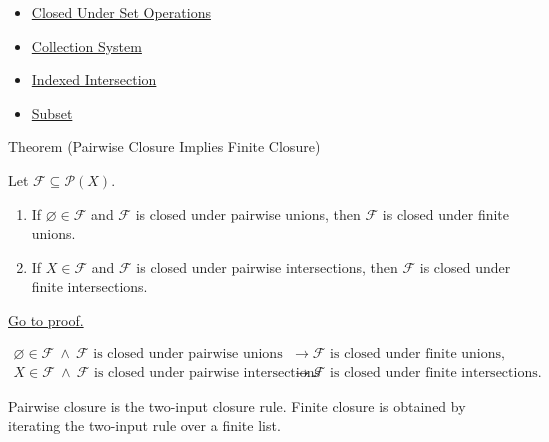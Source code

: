 \begin{dependencies}
\begin{itemize}
  \item \hyperref[def:closed-under-set-operation-vocabulary]{Closed Under Set Operations}
  \item \hyperref[def:collection-system]{Collection System}
  \item \hyperref[def:indexed-intersection]{Indexed Intersection}
  \item \hyperref[def:subset]{Subset}
\end{itemize}
\end{dependencies}

\begin{theorembox}{Theorem (Pairwise Closure Implies Finite Closure)}
\begin{theorem}\label{thm:pairwise-closure-implies-finite-closure}
Let \(\mathcal F\subseteq\mathcal P(X)\).
\begin{enumerate}[label=(\roman*)]
\item If \(\varnothing\in\mathcal F\) and \(\mathcal F\) is closed under
      pairwise unions, then \(\mathcal F\) is closed under finite unions.
\item If \(X\in\mathcal F\) and \(\mathcal F\) is closed under pairwise
      intersections, then \(\mathcal F\) is closed under finite intersections.
\end{enumerate}
\hyperref[prf:pairwise-closure-implies-finite-closure]{Go to proof.}
\end{theorem}
\end{theorembox}

\begin{remark*}
\[
\begin{aligned}
\varnothing\in\mathcal F\ \wedge\
\mathcal F\text{ is closed under pairwise unions}
&\to
\mathcal F\text{ is closed under finite unions},\\
X\in\mathcal F\ \wedge\
\mathcal F\text{ is closed under pairwise intersections}
&\to
\mathcal F\text{ is closed under finite intersections}.
\end{aligned}
\]
\end{remark*}

\begin{remark*}[Interpretation]
Pairwise closure is the two-input closure rule.  Finite closure is obtained by
iterating the two-input rule over a finite list.
\end{remark*}

